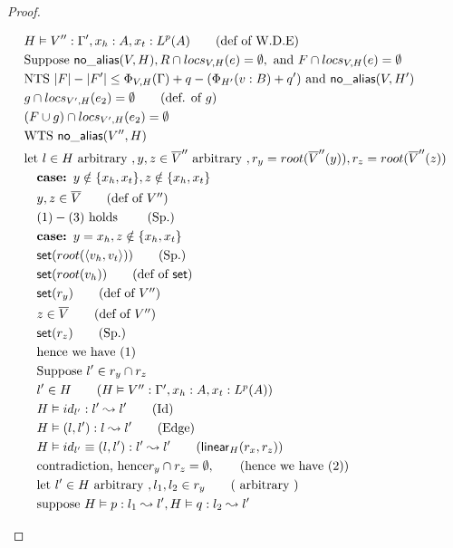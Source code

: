 \documentclass[11pt]{article}
\newcommand{\ms}[1]{\ensuremath{\mathsf{#1}}}
\newcommand{\na}[2]{\mathsf{no\_alias}(#1,#2)}
\begin{document}
\begin{proof}
\begin{description}
\begin{align*}
  &H \vDash V'' : \Gamma', x_h : A, x_t : L^p(A) \tag{def of W.D.E}\\
  &\text{Suppose }  \na{V}{H}, R \cap locs_{V,H}(e) = \emptyset, \text{ and } F \cap locs_{V,H}(e) = \emptyset\\
  &\text{NTS }  |F| - |F'| \le \Phi_{V,H}(\Gamma) +q - (\Phi_{H'}(v:B) + q') \text{ and } \na{V}{H'}\\
  &g \cap locs_{V',H}(e_2) = \emptyset \tag{def. of $g$}\\
  &(F \cup g) \cap locs_{V',H}(e_2) = \emptyset\\
  &\text{WTS } \na{V''}{H}\\
  &\text{let } l \in H \text{ arbitrary }, y, z \in \overline V'' \text{ arbitrary },  r_y = root(\overline V''(y)), r_z = root(\overline V''(z))\\
  &\quad\textbf{case: } y \notin \{x_h,x_t\}, z \notin \{x_h,x_t\}\\
  &\quad y,z \in \overline V \tag{def of $V''$}\\
  &\quad (1) - (3) \text{ holds } \tag{Sp.}\\
  &\quad\textbf{case: } y = x_h, z \notin \{x_h,x_t\}\\
  &\quad \ms{set}(root(\pairexcst{v_h}{v_t})) \tag{Sp.}\\
  &\quad \ms{set}(root(v_h)) \tag{def of $\ms{set}$}\\
  &\quad \ms{set}(r_y) \tag{def of $V''$}\\
  &\quad z \in \overline V \tag{def of $V''$}\\
  &\quad \ms{set}(r_z) \tag{Sp.}\\
  &\quad \text{hence we have (1)}\\
  &\quad \text{Suppose } l' \in r_y \cap r_z\\
  &\quad l' \in H \tag{$H \vDash V'' :  \Gamma', x_h : A, x_t : L^p(A)$}\\
  &\quad H \vDash id_{l'} : l' \leadsto l' \tag{Id}\\
  &\quad H \vDash (l,l') : l \leadsto l' \tag{Edge}\\
  &\quad H \vDash id_{l'} \equiv (l,l') : l' \leadsto l' \tag{$\ms{linear}_H(r_x,r_z)$}\\
  &\quad \text{contradiction, hence} r_y \cap r_z = \emptyset,  \tag{hence we have (2)}\\
  &\quad \text{let } l' \in H \text{ arbitrary }, l_1,l_2 \in r_y \tag{ arbitrary }\\
  &\quad \text{suppose } H \vDash p : l_1 \leadsto l', H \vDash q : l_2 \leadsto l'\\

\end{align*}
\end{description}
\end{proof}
\end{document}
